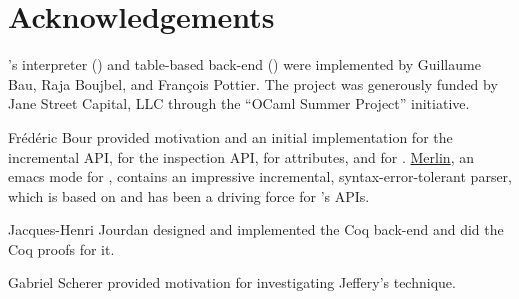 \documentclass[onecolumn,11pt,nocopyrightspace,preprint]{sigplanconf}
\begin{document}

\section{Acknowledgements}

\menhir's interpreter (\ointerpret) and table-based back-end (\otable) were
implemented by Guillaume Bau, Raja Boujbel, and François Pottier. The project
was generously funded by Jane Street Capital, LLC through the ``OCaml Summer
Project'' initiative.

Frédéric Bour provided motivation and an initial implementation for the
incremental API, for the inspection API, for attributes, and for \menhirsdk.
\href{https://github.com/ocaml/merlin}{Merlin}, an emacs mode for \ocaml,
contains an impressive incremental, syntax-error-tolerant \ocaml parser,
which is based on \menhir and has been a driving force for \menhir's APIs.

Jacques-Henri Jourdan designed and implemented the Coq back-end and did the
Coq proofs for it.

Gabriel Scherer provided motivation for investigating Jeffery's technique.





\end{document}
